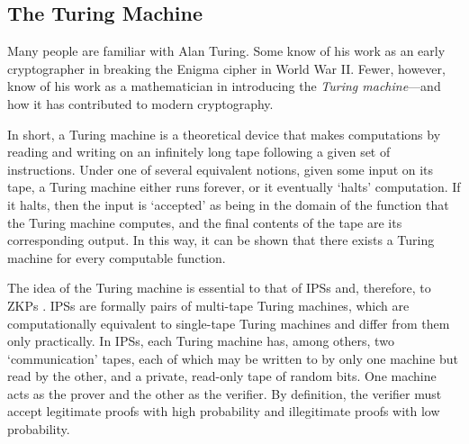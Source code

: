 \documentclass{article}
\begin{document}
\begin{adjustwidth}{0.5in}{0in}
\subsection{The Turing Machine}

Many people are familiar with Alan Turing. Some know of his work as an early cryptographer in breaking the Enigma cipher in World War II. Fewer, however, know of his work as a mathematician in introducing the \textit{Turing machine}---and how it has contributed to modern cryptography.

In short, a Turing machine is a theoretical device that makes computations by reading and writing on an infinitely long tape following a given set of instructions. Under one of several equivalent notions, given some input on its tape, a Turing machine either runs forever, or it eventually `halts' computation. If it halts, then the input is `accepted' as being in the domain of the function that the Turing machine computes, and the final contents of the tape are its corresponding output. In this way, it can be shown that there exists a Turing machine for every computable function.
\end{adjustwidth} \vspace{0.15in}

\noindent The idea of the Turing machine is essential to that of IPSs and, therefore, to ZKPs \cite{GMR}. IPSs are formally pairs of multi-tape Turing machines, which are computationally equivalent to single-tape Turing machines and differ from them only practically. In IPSs, each Turing machine has, among others, two `communication' tapes, each of which may be written to by only one machine but read by the other, and a private, read-only tape of random bits. One machine acts as the prover and the other as the verifier. By definition, the verifier must accept legitimate proofs with high probability and illegitimate proofs with low probability.
\end{document}
